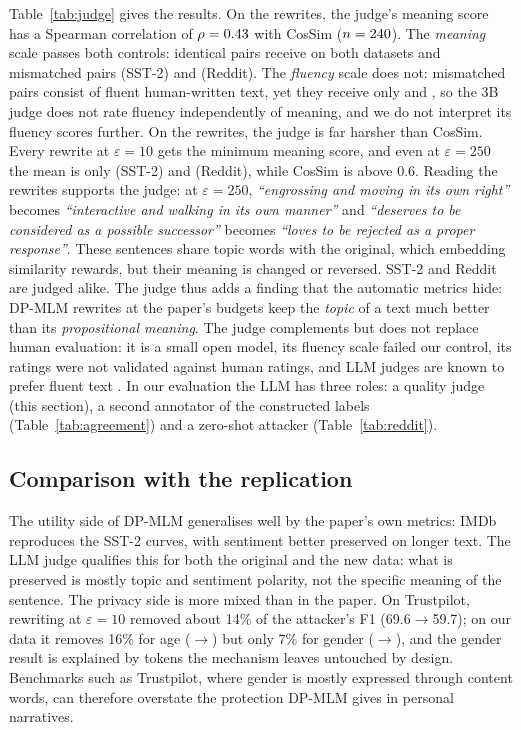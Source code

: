 \documentclass[11pt]{article}
\begin{document}
Table~\ref{tab:judge} gives the results. On the rewrites, the judge's meaning score has a Spearman correlation of $\rho=0.43$ with CosSim ($n=240$). The \emph{meaning} scale passes both controls: identical pairs receive \JSstIdenticalM{} on both datasets and mismatched pairs \JSstMismatchedM{} (SST-2) and \JRedMismatchedM{} (Reddit). The \emph{fluency} scale does not: mismatched pairs consist of fluent human-written text, yet they receive only \JSstMismatchedF{} and \JRedMismatchedF, so the 3B judge does not rate fluency independently of meaning, and we do not interpret its fluency scores further. On the rewrites, the judge is far harsher than CosSim. Every rewrite at $\varepsilon=10$ gets the minimum meaning score, and even at $\varepsilon=250$ the mean is only \JSstEpsTwoFiftyM{} (SST-2) and \JRedEpsTwoFiftyM{} (Reddit), while CosSim is above 0.6. Reading the rewrites supports the judge: at $\varepsilon=250$, \emph{``engrossing and moving in its own right''} becomes \emph{``interactive and walking in its own manner''} and \emph{``deserves to be considered as a possible successor''} becomes \emph{``loves to be rejected as a proper response''}. These sentences share topic words with the original, which embedding similarity rewards, but their meaning is changed or reversed. SST-2 and Reddit are judged alike. The judge thus adds a finding that the automatic metrics hide: DP-MLM rewrites at the paper's budgets keep the \emph{topic} of a text much better than its \emph{propositional meaning}. The judge complements but does not replace human evaluation: it is a small open model, its fluency scale failed our control, its ratings were not validated against human ratings, and LLM judges are known to prefer fluent text \citep{zheng2023judging}. In our evaluation the LLM has three roles: a quality judge (this section), a second annotator of the constructed labels (Table~\ref{tab:agreement}) and a zero-shot attacker (Table~\ref{tab:reddit}).

\subsection{Comparison with the replication}
The utility side of DP-MLM generalises well by the paper's own metrics: IMDb reproduces the SST-2 curves, with sentiment better preserved on longer text. The LLM judge qualifies this for both the original and the new data: what is preserved is mostly topic and sentiment polarity, not the specific meaning of the sentence. The privacy side is more mixed than in the paper. On Trustpilot, rewriting at $\varepsilon=10$ removed about 14\% of the attacker's F1 (69.6$\rightarrow$59.7); on our data it removes 16\% for age (\FAgeSOrig$\rightarrow$\FAgeSTen) but only 7\% for gender (\FGenSOrig$\rightarrow$\FGenSTen), and the gender result is explained by tokens the mechanism leaves untouched by design. Benchmarks such as Trustpilot, where gender is mostly expressed through content words, can therefore overstate the protection DP-MLM gives in personal narratives.
\end{document}
